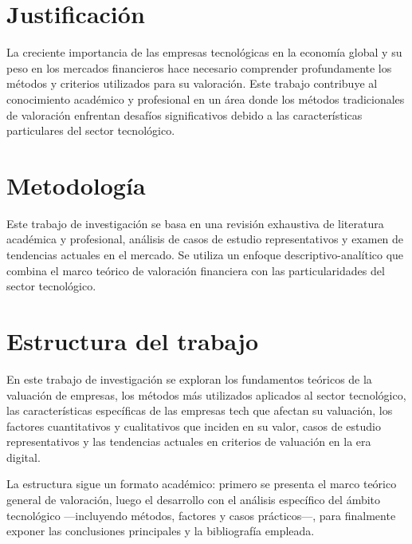 \section{Justificación}

La creciente importancia de las empresas tecnológicas en la economía global y su peso en los mercados financieros hace necesario comprender profundamente los métodos y criterios utilizados para su valoración. Este trabajo contribuye al conocimiento académico y profesional en un área donde los métodos tradicionales de valoración enfrentan desafíos significativos debido a las características particulares del sector tecnológico.

\section{Metodología}

Este trabajo de investigación se basa en una revisión exhaustiva de literatura académica y profesional, análisis de casos de estudio representativos y examen de tendencias actuales en el mercado. Se utiliza un enfoque descriptivo-analítico que combina el marco teórico de valoración financiera con las particularidades del sector tecnológico.

\section{Estructura del trabajo}

En este trabajo de investigación se exploran los fundamentos teóricos de la valuación de empresas, los métodos más utilizados aplicados al sector tecnológico, las características específicas de las empresas tech que afectan su valuación, los factores cuantitativos y cualitativos que inciden en su valor, casos de estudio representativos y las tendencias actuales en criterios de valuación en la era digital.

La estructura sigue un formato académico: primero se presenta el marco teórico general de valoración, luego el desarrollo con el análisis específico del ámbito tecnológico ---incluyendo métodos, factores y casos prácticos---, para finalmente exponer las conclusiones principales y la bibliografía empleada. 